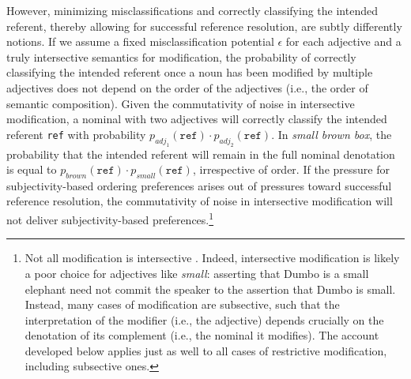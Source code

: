 \documentclass[preprint,authoryear]{elsarticle}\frenchspacing
\begin{document}
However, minimizing misclassifications and correctly classifying the intended referent, thereby allowing for successful reference resolution, are subtly differently notions. If we assume a fixed misclassification potential $\epsilon$ for each adjective and a truly intersective semantics for modification, the probability of correctly classifying the intended referent once a noun has been modified by multiple adjectives does not depend on the order of the adjectives (i.e., the order of semantic composition). %
Given the commutativity of noise in intersective modification, a nominal with two adjectives will correctly classify the intended referent \texttt{ref} with probability $p_{adj_1}(\texttt{ref}) \cdot p_{adj_2}(\texttt{ref})$. In \emph{small brown box}, the probability that the intended referent will remain in the full nominal denotation is equal to $p_{brown}(\texttt{ref}) \cdot p_{small}(\texttt{ref})$, irrespective of order. If the pressure for subjectivity-based ordering preferences %
arises out of pressures toward successful reference resolution, the commutativity of noise in intersective modification will not deliver subjectivity-based preferences.\footnote{Not all modification is intersective \citep{kamppartee1995,truswell2009,mcnally2016}. Indeed, intersective modification is likely a poor choice for adjectives like \emph{small}: asserting that Dumbo is a small elephant need not commit the speaker to the assertion that Dumbo is small. Instead, many cases of modification are subsective, such that the interpretation of the modifier (i.e., the adjective) depends crucially on the denotation of its complement (i.e., the nominal it modifies). The account developed below applies just as well to all cases of restrictive modification, including subsective ones.}
\end{document}
